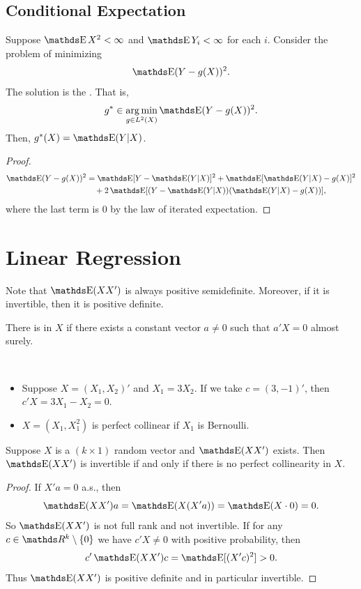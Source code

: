 \documentclass[letterpaper, 10pt]{article}
\begin{document}
\subsection{Conditional Expectation}
Suppose \(\E X^2 < \infty\) and \(\E Y_i < \infty\) for each \(i\).
Consider the problem of minimizing
\[
  \E(Y - g(X))^2.
\]
The solution is the .
That is,
\[
  g^* \in \argmin_{g \in L^2(X)} \E(Y - g(X))^2.
\]
Then, \(g^*(X) = \E(Y|X)\).
\begin{proof}
  \begin{align*}
    \E(Y - g(X))^2
    &= \E[Y - \E(Y|X)]^2 + \E[\E(Y|X) - g(X)]^2 \\
    &\quad+ 2\E[(Y - \E(Y|X))(\E(Y|X) - g(X))],
  \end{align*}
  where the last term is \(0\) by the law of iterated expectation.
\end{proof}

\section{Linear Regression}
\begin{proposition}
  Note that \(\E(XX')\) is always positive semidefinite.
  Moreover, if it is invertible, then it is positive definite.
\end{proposition}

\begin{definition}
  There is  in \(X\) if there exists a constant vector \(a \neq 0\) such that \(a'X = 0\) almost surely.
\end{definition}
\begin{example}~
  \begin{itemize}
    \item Suppose \(X = (X_1, X_2)'\) and \(X_1 = 3X_2\).
      If we take \(c = (3, -1)'\), then \(c'X = 3X_1 - X_2 = 0\).
    \item \(X = (X_1, X_1^2)\) is perfect collinear if \(X_1\) is Bernoulli.
  \end{itemize}
\end{example}

\begin{proposition}
  Suppose \(X\) is a \((k \times 1)\) random vector and \(\E(XX')\) exists.
  Then \(\E(XX')\) is invertible if and only if there is no perfect collinearity in \(X\).
\end{proposition}
\begin{proof}
  If \(X'a = 0\) a.s., then
  \[
    \E(XX')a
    = \E(X(X'a))
    = \E(X \cdot 0)
    = 0.
  \]
  So \(\E(XX')\) is not full rank and not invertible.
  If for any \(c \in \RR^k \setminus \{0\}\) we have \(c' X \neq 0\) with positive probability, then
  \[
    c' \E(XX') c = \E[(X'c)^2] > 0.
  \]
  Thus \(\E(XX')\) is positive definite and in particular invertible.
\end{proof}
\end{document}
